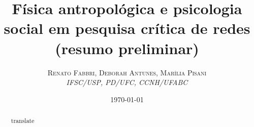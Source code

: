 \documentclass[a4paper, 11pt]{article} %
\title{\textbf{Física antropológica e psicologia social em pesquisa crítica de redes}\\ %
(resumo preliminar)} %
\author{\textsc{Renato Fabbri, Deborah Antunes, Marília Pisani} %
\\{\textit{IFSC/USP, PD/UFC, CCNH/UFABC}}} %
\date{\today} %
\makeatletter
\renewcommand{\maketitle}{ %
\begin{flushright} %
{\LARGE\@title} %

\vspace{50pt} %

{\large\@author} %
\\\@date %

\vspace{40pt} %
\end{flushright}
}
\makeatother
\begin{document}
\maketitle %




{
\begin{abstract}
	translate
\end{abstract}
}
\end{document}
